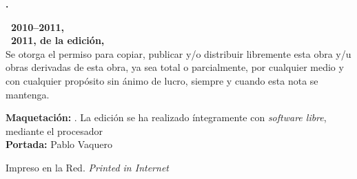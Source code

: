 \noindent
\textbf{\thetitle. \ \thesubtitle}\\
\theauthor

\bigskip\bigskip\footnotesize\noindent
\textbf{\copyleft\ 2010--2011, \theauthor}\\
\textbf{\copyleft\ 2011, de la edición, \theeditor}\\
Se otorga el permiso para copiar, publicar y/o distribuir libremente esta obra y/u obras derivadas de esta obra, ya sea total o parcialmente, por cualquier medio y con cualquier propósito sin ánimo de lucro, siempre y cuando esta nota se mantenga.

\bigskip\noindent
\textbf{Maquetación:} \theeditor. La edición se ha realizado íntegramente con \emph{software libre}, mediante el procesador \emph{\LaTeXe}\\
\textbf{Portada:} Pablo Vaquero

\bigskip\noindent
Impreso en la Red. \emph{Printed in Internet}
\normalsize
{}

\endinput
